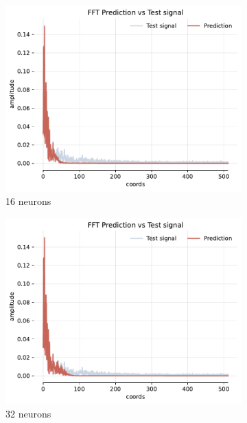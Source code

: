 \begin{figure}[!h]
    \begin{subfigure}[b]{0.32\textwidth}
        \centering
        \includegraphics[width=\textwidth]{img/ch4/fft-noise-1hl-16hf-w8.pdf}
        \caption{16 neurons}
        \label{fig:fft-noise-1hl-16hf-w8}
    \end{subfigure}
    \begin{subfigure}[b]{0.32\textwidth}
        \centering
        \includegraphics[width=\textwidth]{img/ch4/fft-noise-1hl-32hf-w8.pdf}
        \caption{32 neurons}
        \label{fig:comp-fft-noise-1hl-32hf-w8}
    \end{subfigure}
    \begin{subfigure}[b]{0.32\textwidth}

\end{subfigure}
\end{figure}
